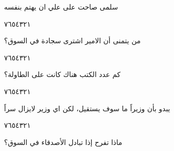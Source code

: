 \documentclass[11pt, a4paper]{article}
\begin{document}
{\vspace{0.5\baselineskip}\begin{flushright}
\textarabic{سلمى صاحت على علي ان يهتم بنفسه}
\end{flushright}

\begin{center}
        \hfill\textarabic{٧}\hfill\textarabic{٦}\hfill\textarabic{٥}\hfill\textarabic{٤}\hfill\textarabic{٣}\hfill\textarabic{٢}\hfill\textarabic{١}
        \end{center}


\vspace{0.5\baselineskip}\begin{flushright}
\textarabic{من يتمنى أن الامير اشترى سجادة في السوق؟}
\end{flushright}

\begin{center}
        \hfill\textarabic{٧}\hfill\textarabic{٦}\hfill\textarabic{٥}\hfill\textarabic{٤}\hfill\textarabic{٣}\hfill\textarabic{٢}\hfill\textarabic{١}
        \end{center}


\vspace{0.5\baselineskip}\begin{flushright}
\textarabic{كم عدد الكتب هناك كانت على الطاولة؟}
\end{flushright}

\begin{center}
        \hfill\textarabic{٧}\hfill\textarabic{٦}\hfill\textarabic{٥}\hfill\textarabic{٤}\hfill\textarabic{٣}\hfill\textarabic{٢}\hfill\textarabic{١}
        \end{center}


\vspace{0.5\baselineskip}\begin{flushright}
\textarabic{يبدو بأن وزيراً ما سوف يستقيل، لكن اي وزير لايزال سراً}
\end{flushright}

\begin{center}
        \hfill\textarabic{٧}\hfill\textarabic{٦}\hfill\textarabic{٥}\hfill\textarabic{٤}\hfill\textarabic{٣}\hfill\textarabic{٢}\hfill\textarabic{١}
        \end{center}


\vspace{0.5\baselineskip}\begin{flushright}
\textarabic{ماذا تفرح إذا تبادل الأصدقاء في السوق؟}
\end{flushright}

}
\end{document}
